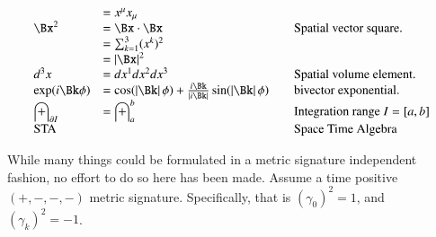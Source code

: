 \documentclass{article}
\begin{document}
\begin{equation*}
\begin{array}{l l l}
    &= x^\mu x_\mu \\
\Bx^2 &= \Bx \cdot \Bx & \quad \mbox{Spatial vector square. } \\
    &= \sum_{k=1}^3 (x^k)^2 \\
    &= \Abs{\Bx}^2 \\
d^3 x &= dx^1 dx^2 dx^3 & \quad \mbox{Spatial volume element. } \\
\exp(i\Bk\phi) &= 
\cos(\Abs{\Bk}\phi) + \frac{i \Bk}{\Abs{i\Bk}} \sin(\Abs{\Bk}\phi) & \quad \mbox{bivector exponential. } \\
\int_{\partial I} &= \int_{a}^{b} & \quad \mbox{Integration range $I = [a,b]$ } \\
\text{STA} & & \quad \mbox{Space Time Algebra} \\
\end{array}
\end{equation*}

While many things could be formulated in a metric signature independent fashion, no effort to do so here has been made.  Assume
a time positive
$(+,-,-,-)$
metric signature.  Specifically, that is $(\gamma_0)^2 = 1$, and $(\gamma_k)^2 = -1$.  




\end{document}
